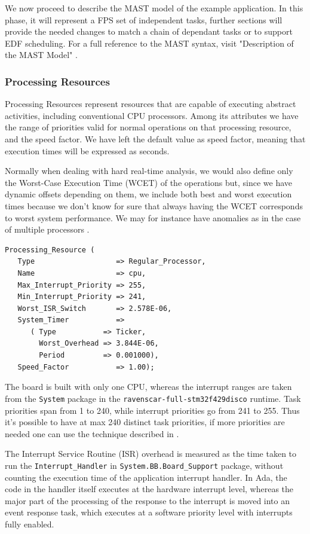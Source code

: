 \documentclass{article}
\begin{document}
We now proceed to describe the MAST model of the example application. In this phase, it will represent a FPS set of independent tasks, further sections will provide the needed changes to match a chain of dependant tasks or to support EDF scheduling. For a full reference to the MAST syntax, visit "Description of the MAST Model" \cite{mast-description}.

\subsubsection{Processing Resources}\label{processing-resources}

Processing Resources represent resources that are capable of executing abstract activities, including conventional CPU processors. Among its attributes we have the range of priorities valid for normal operations on that processing resource, and the speed factor. We have left the default value as speed factor, meaning that execution times will be expressed as seconds.

Normally when dealing with hard real-time analysis, we would also define only the Worst-Case Execution Time (WCET) of the operations but, since we have dynamic offsets depending on them, we include both best and worst execution times because we don't know for sure that always having the WCET corresponds to worst system performance. We may for instance have anomalies as in the case of multiple processors \cite{anomalies-multiprocessor}.

\begin{lstlisting}
Processing_Resource (
   Type                   => Regular_Processor,
   Name                   => cpu,
   Max_Interrupt_Priority => 255,
   Min_Interrupt_Priority => 241,
   Worst_ISR_Switch       => 2.578E-06,
   System_Timer           =>
      ( Type           => Ticker,
        Worst_Overhead => 3.844E-06,
        Period         => 0.001000),
   Speed_Factor           => 1.00);
\end{lstlisting}

The board is built with only one CPU, whereas the interrupt ranges are taken from the \texttt{System} package in the \texttt{ravenscar-full-stm32f429disco} runtime. Task priorities span from 1 to 240, while interrupt priorities go from 241 to 255. Thus it's possible to have at max 240 distinct task priorities, if more priorities are needed one can use the technique described in \cite{limited-priorities}.

The Interrupt Service Routine (ISR) overhead is measured as the time taken to run the \texttt{Interrupt\_Handler} in \texttt{System.BB.Board\_Support} package, without counting the execution time of the application interrupt handler. In Ada, the code in the handler itself executes at the hardware interrupt level, whereas the major part of the processing of the response to the interrupt is moved into an event response task, which executes at a software priority level with interrupts fully enabled.
\end{document}

